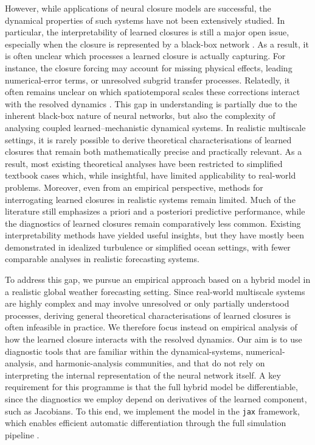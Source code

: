 However, while applications of neural closure models are successful, the dynamical properties of such systems have not been extensively studied. In particular, the interpretability of learned closures is still a major open issue, especially when the closure is represented by a black-box network \citep{Sanderse2025,Beck2021}. As a result, it is often unclear which processes a learned closure is actually capturing. For instance, the closure forcing may account for missing physical effects, leading numerical-error terms, or unresolved subgrid transfer processes. Relatedly, it often remains unclear on which spatiotemporal scales these corrections interact with the resolved dynamics \citep{Gupta2023,Portwood2021}. This gap in understanding is partially due to the inherent black-box nature of neural networks, but also the complexity of analysing coupled learned–mechanistic dynamical systems. In realistic multiscale settings, it is rarely possible to derive theoretical characterisations of learned closures that remain both mathematically precise and practically relevant. As a result, most existing theoretical analyses have been restricted to simplified textbook cases which, while insightful, have limited applicability to real-world problems. Moreover, even from an empirical perspective, methods for interrogating learned closures in realistic systems remain limited. Much of the literature still emphasizes a priori and a posteriori predictive performance, while the diagnostics of learned closures remain comparatively less common. Existing interpretability methods have yielded useful insights, but they have mostly been demonstrated in idealized turbulence or simplified ocean settings, with fewer comparable analyses in realistic forecasting systems.

To address this gap, we pursue an empirical approach based on a hybrid model in a realistic global weather forecasting setting. Since real-world multiscale systems are highly complex and may involve unresolved or only partially understood processes, deriving general theoretical characterisations of learned closures is often infeasible in practice. We therefore focus instead on empirical analysis of how the learned closure interacts with the resolved dynamics. Our aim is to use diagnostic tools that are familiar within the dynamical-systems, numerical-analysis, and harmonic-analysis communities, and that do not rely on interpreting the internal representation of the neural network itself. A key requirement for this programme is that the full hybrid model be differentiable, since the diagnostics we employ depend on derivatives of the learned component, such as Jacobians. To this end, we implement the model in the \texttt{jax} framework, which enables efficient automatic differentiation through the full simulation pipeline \cite{wengert1964simple,linnainmaa1976taylor,jax}.


